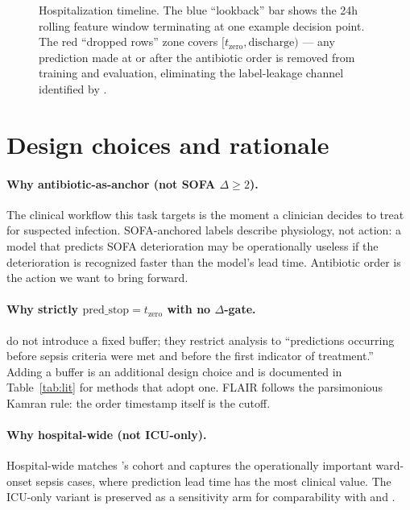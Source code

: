 \documentclass[11pt]{article}
\newcommand{\tzero}{t_{\text{zero}}}
\newcommand{\predstop}{\text{pred\_stop}}
\begin{document}
\begin{figure}[H]
\centering

\caption{Hospitalization timeline. The blue ``lookback'' bar shows the
24h rolling feature window terminating at one example decision point.
The red ``dropped rows'' zone covers $[\tzero, \text{discharge})$ ---
any prediction made at or after the antibiotic order is removed from
training and evaluation, eliminating the label-leakage channel
identified by \citet{kamran2024sepsis}.}
\label{fig:timeline}
\end{figure}

\section{Design choices and rationale}
\label{sec:rationale}

\paragraph{Why antibiotic-as-anchor (not SOFA $\Delta\!\ge\!2$).}
The clinical workflow this task targets is the moment a clinician
decides to treat for suspected infection. SOFA-anchored labels
\citep{singer2016sepsis3, reyna2020physionet} describe physiology, not
action: a model that predicts SOFA deterioration may be operationally
useless if the deterioration is recognized faster than the model's lead
time. Antibiotic order is the action we want to bring forward.

\paragraph{Why strictly $\predstop = \tzero$ with no $\Delta$-gate.}
\citet{kamran2024sepsis} do not introduce a fixed buffer; they restrict
analysis to ``predictions occurring before sepsis criteria were met and
before the first indicator of treatment.'' Adding a buffer is an
additional design choice and is documented in Table~\ref{tab:lit} for
methods that adopt one. FLAIR follows the parsimonious Kamran rule: the
order timestamp itself is the cutoff.

\paragraph{Why hospital-wide (not ICU-only).}
Hospital-wide matches \citet{kamran2024sepsis}'s cohort and captures
the operationally important ward-onset sepsis cases, where prediction
lead time has the most clinical value. The ICU-only variant is
preserved as a sensitivity arm for comparability with
\citet{shashikumar2021aise} and \citet{desautels2016insight}.
\end{document}
